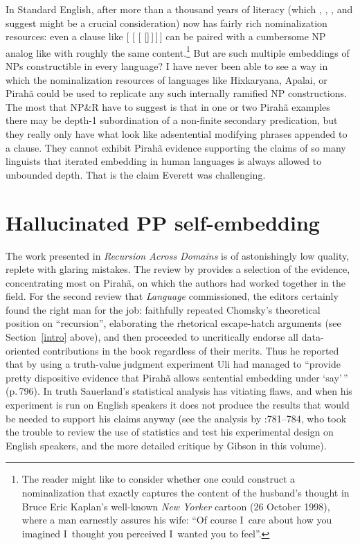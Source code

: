\documentclass[output=paper,colorlinks,citecolor=brown
]{langscibook}
\begin{document}
In Standard English, after more than a thousand years of literacy
(which \citealt{ONeil77}, \citealt{Givon79}, \citealt{Mithun84}, and
\citealt{Kalmar85} suggest might be a crucial consideration) now has
fairly rich nominalization resources: even a clause like
 [ [
[ []\,]\,]\,] can be paired with
a cumbersome NP analog like  with roughly
the same content.\footnote{%
   The reader might like to consider whether one could construct a
   nominalization that exactly captures the content of the husband's
   thought in Bruce Eric Kaplan's well-known \textit{New Yorker}
   cartoon (26 October 1998), where a man earnestly assures his wife:
   ``Of course I~care about how you imagined I~thought you perceived
   I~wanted you to feel''.}
But are such multiple embeddings of NPs constructible in every language?
I have never been able to see a way in which the nominalization resources
of languages like Hixkaryana, Apalai, or Pirah{\~a} could be used to
replicate any such internally ramified NP constructions. The most that
NP\&R have to suggest is that in one or two Pirah{\~a} examples there
may be depth-1 subordination of a non-finite secondary predication, but
they really only have what look like adsentential modifying phrases
appended to a clause. They cannot exhibit Pirah{\~a} evidence supporting
the claims of so many linguists that iterated embedding in human
languages is always allowed to unbounded depth. That is the claim
Everett was challenging.

\section{Hallucinated PP self-embedding}\label{ppsection}

The work presented in \textit{Recursion Across Domains} \citep{AmMaNeRo18}
is of astonishingly low quality, replete with glaring mistakes. The review
by \citet{EverGibs19} provides a selection of the evidence, concentrating
most on Pirah{\~a}, on which the authors had worked together in the field.
For the second review that \textit{Language} commissioned, the editors
certainly found the right man for the job: \citet{Hornstein19} faithfully
repeated Chomsky's theoretical position on ``recursion'', elaborating
the rhetorical escape-hatch arguments (see Section~\ref{intro} above),
and then proceeded to uncritically endorse all data-oriented contributions
in the book regardless of their merits. Thus he reported that by using a
truth-value judgment experiment Uli \citet{Sauerland18} had managed to
``provide pretty dispositive evidence that Pirah{\~a} allows sentential
embedding under `say'\,'' (p.\,796). In truth Sauerland's statistical
analysis has vitiating flaws, and when his experiment is run on English
speakers it does not produce the results that would be needed to
support his claims anyway (see the analysis by
\citealt{EverGibs19}:781--784, who took the trouble to review the use
of statistics and test his experimental design on English speakers,
and the more detailed critique by Gibson in this volume).
\end{document}
